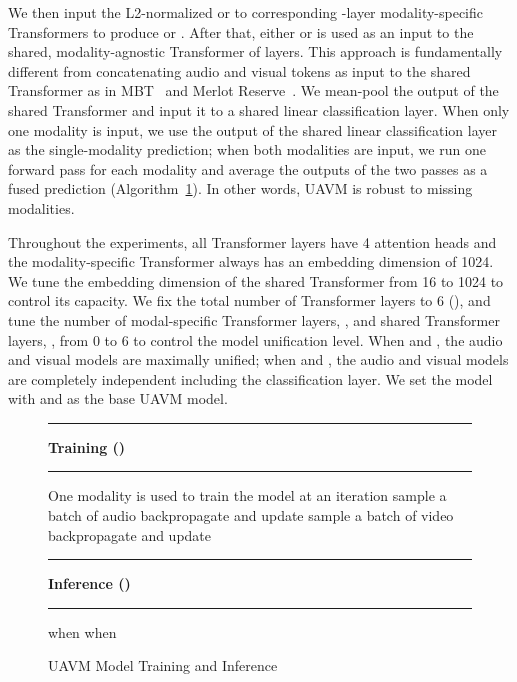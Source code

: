 \documentclass[journal]{IEEEtran}
\newcommand\Algphase[1]{\vspace*{-0.5\baselineskip}\Statex\hspace*{\dimexpr-\algorithmicindent-2pt\relax}\rule{8.56cm}{0.4pt}\Statex\hspace*{-\algorithmicindent}\textbf{#1}\vspace*{-0.5\baselineskip}\Statex\hspace*{\dimexpr-\algorithmicindent-2pt\relax}\rule{8.56cm}{0.4pt}}
\begin{document}
We then input the L2-normalized  or  to corresponding -layer modality-specific Transformers to produce  or . After that, either  or  is used as an input  to the shared, modality-agnostic Transformer of  layers. This approach is fundamentally different from concatenating audio and visual tokens as input to the shared Transformer as in MBT~\cite{nagrani2021attention} and Merlot Reserve~\cite{zellers2022merlot}. We mean-pool the output of the shared Transformer  and input it to a shared linear classification layer. When only one modality is input, we use the output of the shared linear classification layer as the single-modality prediction; when both modalities are input, we run one forward pass for each modality and average the outputs of the two passes as a fused prediction (Algorithm~\ref{alg:train}). In other words, UAVM is robust to missing modalities.

Throughout the experiments, all Transformer layers have 4 attention heads and the modality-specific Transformer always has an embedding dimension of 1024. We tune the embedding dimension of the shared Transformer  from 16 to 1024 to control its capacity. We fix the total number of Transformer layers to 6 (), and tune the number of modal-specific Transformer layers, , and shared Transformer layers, , from 0 to 6 to control the model unification level. When  and , the audio and visual models are maximally unified; when  and , the audio and visual models are completely independent including the classification layer. We set the model with  and  as the base UAVM model. 

\begin{figure}[t]
\vspace{-1em}
\begin{algorithm}[H]
\footnotesize
\caption{UAVM Model Training and Inference}
\label{alg:train}
\begin{algorithmic}[1]
\Algphase{Training ()}
\While {}
\newline  One modality is used to train the model at an iteration
\State sample a batch of audio 
\State 
\State 
\State backpropagate and update 
\Else
\State sample a batch of video 
\State 
\State 
\State backpropagate and update 
\EndIf
\EndWhile
\Return 

\Algphase{Inference ()}
\State 
{}
\State  when 
\State  when 
\EndIf
\Return 
\end{algorithmic}
\end{algorithm}
\vspace{-2.2em}
\end{figure}
\end{document}

